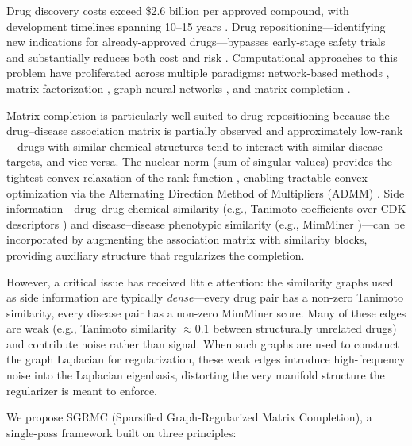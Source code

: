 \documentclass[webpdf,modern,large]{oup-authoring-template}
\begin{document}
Drug discovery costs exceed \$2.6 billion per approved compound, with development timelines spanning 10--15 years \cite{dimasi2003,paul2010}. Drug repositioning---identifying new indications for already-approved drugs---bypasses early-stage safety trials and substantially reduces both cost and risk \cite{chong2007}. Computational approaches to this problem have proliferated across multiple paradigms: network-based methods \cite{martinez2015,luo2016}, matrix factorization \cite{dai2015,ezzat2017,zheng2013}, graph neural networks \cite{fu2022,gao2023}, and matrix completion \cite{yang2019,luo2018,mongia2022}.

Matrix completion is particularly well-suited to drug repositioning because the drug--disease association matrix is partially observed and approximately low-rank---drugs with similar chemical structures tend to interact with similar disease targets, and vice versa. The nuclear norm (sum of singular values) provides the tightest convex relaxation of the rank function \cite{candes2009}, enabling tractable convex optimization via the Alternating Direction Method of Multipliers (ADMM) \cite{boyd2011}. Side information---drug--drug chemical similarity (e.g., Tanimoto coefficients over CDK descriptors \cite{steinbeck2003}) and disease--disease phenotypic similarity (e.g., MimMiner \cite{vandriel2006})---can be incorporated by augmenting the association matrix with similarity blocks, providing auxiliary structure that regularizes the completion.

However, a critical issue has received little attention: the similarity graphs used as side information are typically \emph{dense}---every drug pair has a non-zero Tanimoto similarity, every disease pair has a non-zero MimMiner score. Many of these edges are weak (e.g., Tanimoto similarity $\approx 0.1$ between structurally unrelated drugs) and contribute noise rather than signal. When such graphs are used to construct the graph Laplacian for regularization, these weak edges introduce high-frequency noise into the Laplacian eigenbasis, distorting the very manifold structure the regularizer is meant to enforce.

We propose SGRMC (Sparsified Graph-Regularized Matrix Completion), a single-pass framework built on three principles:
\end{document}
